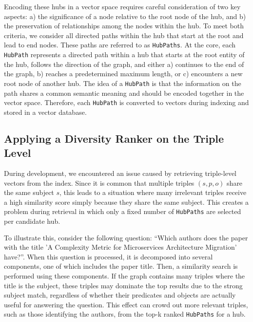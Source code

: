 Encoding these hubs in a vector space requires careful consideration of two key aspects: a) the significance of a node relative to the root node of the hub, and b) the preservation of relationships among the nodes within the hub. To meet both criteria, we consider all directed paths within the hub that start at the root and lead to end nodes. These paths are referred to as \texttt{HubPaths}. At the core, each \texttt{HubPath} represents a directed path within a hub that starts at the root entity of the hub, follows the direction of the graph, and either a) continues to the end of the graph, b) reaches a predetermined maximum length, or c) encounters a new root node of another hub. The idea of a \texttt{HubPath} is that the information on the path shares a common semantic meaning and should be encoded together in the vector space. Therefore, each \texttt{HubPath} is converted to vectors during indexing and stored in a vector database.


\subsection{Applying a Diversity Ranker on the Triple Level}

During development, we encountered an issue caused by retrieving triple-level vectors from the index. Since it is common that multiple triples $(s,p,o)$ share the same subject $s$, this leads to a situation where many irrelevant triples receive a high similarity score simply because they share the same subject. This creates a problem during retrieval in which only a fixed number of \texttt{HubPaths} are selected per candidate hub.

To illustrate this, consider the following question: \enquote{Which authors does the paper with the title 'A Complexity Metric for Microservices Architecture Migration' have?}. When this question is processed, it is decomposed into several components, one of which includes the paper title. Then, a similarity search is performed using these components. If the graph contains many triples where the title is the subject, these triples may dominate the top results due to the strong subject match, regardless of whether their predicates and objects are actually useful for answering the question. This effect can crowd out more relevant triples, such as those identifying the authors, from the top-k ranked \texttt{HubPaths} for a hub.


